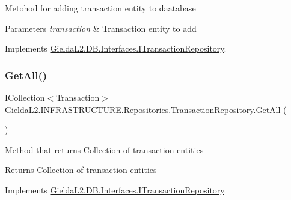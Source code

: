Metohod for adding transaction entity to daatabase 


\begin{DoxyParams}{Parameters}
{\em transaction} & Transaction entity to add\\
\hline
\end{DoxyParams}


Implements \mbox{\hyperlink{interface_gielda_l2_1_1_d_b_1_1_interfaces_1_1_i_transaction_repository_a3f4295d1d4898ed86d72734cc970cd90}{Gielda\+L2.\+D\+B.\+Interfaces.\+I\+Transaction\+Repository}}.

\mbox{\label{class_gielda_l2_1_1_i_n_f_r_a_s_t_r_u_c_t_u_r_e_1_1_repositories_1_1_transaction_repository_ac6358b55acc0931a286b83417c937aa2}} 
\subsubsection{\texorpdfstring{GetAll()}{GetAll()}}
{\footnotesize\ttfamily I\+Collection$<$\mbox{\hyperlink{class_gielda_l2_1_1_d_b_1_1_entities_1_1_transaction}{Transaction}}$>$ Gielda\+L2.\+I\+N\+F\+R\+A\+S\+T\+R\+U\+C\+T\+U\+R\+E.\+Repositories.\+Transaction\+Repository.\+Get\+All (\begin{DoxyParamCaption}{ }\end{DoxyParamCaption})}



Method that returns Collection of transaction entities 

\begin{DoxyReturn}{Returns}
Collection of transaction entities
\end{DoxyReturn}


Implements \mbox{\hyperlink{interface_gielda_l2_1_1_d_b_1_1_interfaces_1_1_i_transaction_repository_a75aa347958df45ffbb7133fce8ba496f}{Gielda\+L2.\+D\+B.\+Interfaces.\+I\+Transaction\+Repository}}.

\mbox{\label{class_gielda_l2_1_1_i_n_f_r_a_s_t_r_u_c_t_u_r_e_1_1_repositories_1_1_transaction_repository_a97d31c2f5374525c76dc08d1ebaa8f52}} 
